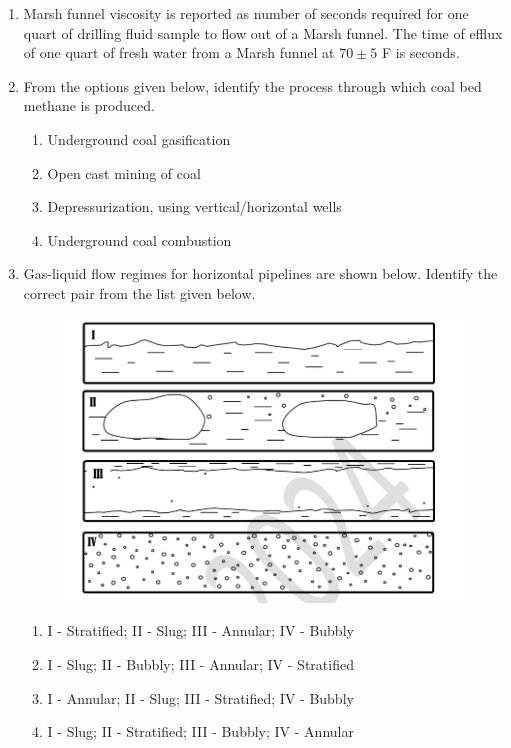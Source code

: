 \documentclass[journal,12pt,onecolumn]{IEEEtran}
\theoremstyle{remark}
\begin{document}
\begin{enumerate}
 \item Marsh funnel viscosity is reported as number of seconds required for one quart of drilling fluid sample to flow out of a Marsh funnel. The time of efflux of one quart of fresh water from a Marsh funnel at $70\pm5$ F is \underline{\hspace{1cm}} seconds.
\begin{enumerate}
\end{enumerate}
\hfill{}


\item  From the options given below, identify the process through which coal bed methane is produced.
\begin{enumerate}
    \item Underground coal gasification
    \item Open cast mining of coal
    \item Depressurization, using vertical/horizontal wells
    \item Underground coal combustion
\end{enumerate}
\hfill{}



\item  Gas-liquid flow regimes for horizontal pipelines are shown below. Identify the correct pair from the list given below.
\begin{figure}[h]
    \centering
    \includegraphics[width=0.5\columnwidth]{figs/im 5.jpeg}
    \caption{}
    \label{fig:placeholder}
\end{figure}
\begin{enumerate}
    \item I - Stratified; II - Slug; III - Annular; IV - Bubbly
    \item I - Slug; II - Bubbly; III - Annular; IV - Stratified
    \item I - Annular; II - Slug; III - Stratified; IV - Bubbly
    \item I - Slug; II - Stratified; III - Bubbly; IV - Annular
\end{enumerate}
\hfill{}




\end{enumerate}
\end{document}
